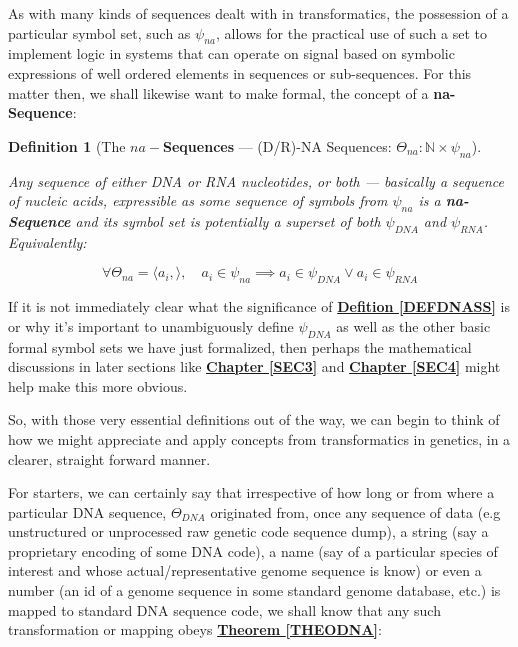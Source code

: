 \documentclass[a4paper, 18pt]{book} %
\newtheorem{defn}{Definition}
\begin{document}
As with many kinds of sequences dealt with in transformatics, the possession of a particular symbol set, such as $\psi_{na}$, allows for the practical use of such a set to implement logic in systems that can operate on signal based on symbolic expressions of well ordered elements in sequences or sub-sequences. For this matter then, we shall likewise want to make formal, the concept of a \textbf{na-Sequence}:

\begin{defn}[The \textbf{$na-$Sequences} --- (D/R)-NA Sequences: $\Theta_{na}:\mathbb{N} \times \psi_{na}$]
\label{DEFNASEQ}

Any sequence of either DNA or RNA nucleotides, or both --- basically a sequence of nucleic acids, expressible as some sequence of symbols from $\psi_{na}$ is a \textbf{na-Sequence} and its symbol set is potentially a superset of both $\psi_{DNA}$ and $\psi_{RNA}$. Equivalently:

\begin{equation}
\forall \Theta_{na} = \langle a_i, \rangle, \quad a_i \in \psi_{na} \implies a_i \in \psi_{DNA} \lor a_i \in \psi_{RNA}
\end{equation}

\end{defn}


If it is not immediately clear what the significance of \textbf{\hyperref[DEFDNASS]{Defition \ref{DEFDNASS}}} is or why it's important to unambiguously define $\psi_{DNA}$ as well as the other basic formal symbol sets we have just formalized, then perhaps the mathematical discussions in later sections like \textbf{\hyperref[SEC3]{Chapter \ref{SEC3}}} and \textbf{\hyperref[SEC4]{Chapter \ref{SEC4}}} might help make this more obvious.

So, with those very essential definitions out of the way, we can begin to think of how we might appreciate and apply concepts from transformatics in genetics, in a clearer, straight forward manner.

For starters, we can certainly say that irrespective of how long or from where a particular DNA sequence, $\Theta_{DNA}$ originated from, once any sequence of data (e.g unstructured or unprocessed raw genetic code sequence dump), a string (say a proprietary encoding of some DNA code), a name (say of a particular species of interest and whose actual/representative genome sequence is know) or even a number (an id of a genome sequence in some standard genome database, etc.) is mapped to standard
DNA sequence code, we shall know that any such transformation or mapping obeys \textbf{\hyperref[THEODNA]{Theorem \ref{THEODNA}}}:
\end{document}
